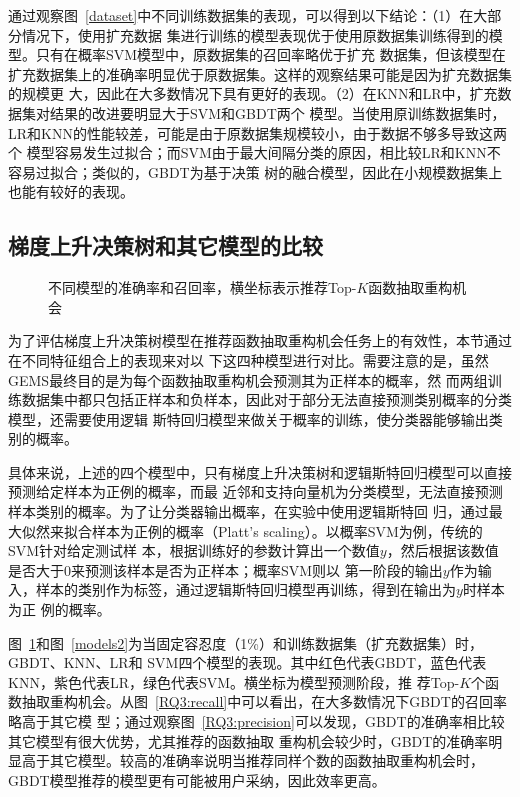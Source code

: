 通过观察图~\ref{dataset}中不同训练数据集的表现，可以得到以下结论：（1）在大部分情况下，使用扩充数据
集进行训练的模型表现优于使用原数据集训练得到的模型。只有在概率SVM模型中，原数据集的召回率略优于扩充
数据集，但该模型在扩充数据集上的准确率明显优于原数据集。这样的观察结果可能是因为扩充数据集的规模更
大，因此在大多数情况下具有更好的表现。（2）在KNN和LR中，扩充数据集对结果的改进要明显大于SVM和GBDT两个
模型。当使用原训练数据集时，LR和KNN的性能较差，可能是由于原数据集规模较小，由于数据不够多导致这两个
模型容易发生过拟合；而SVM由于最大间隔分类的原因，相比较LR和KNN不容易过拟合；类似的，GBDT为基于决策
树的融合模型，因此在小规模数据集上也能有较好的表现。

\subsection{梯度上升决策树和其它模型的比较}\label{RQ3}

\begin{figure}
\centering
{}
\hfill
{}
\caption{不同模型的准确率和召回率，横坐标表示推荐Top-$K$函数抽取重构机会}
\label{models1}
\end{figure}

为了评估梯度上升决策树模型在推荐函数抽取重构机会任务上的有效性，本节通过在不同特征组合上的表现来对以
下这四种模型进行对比。需要注意的是，虽然GEMS最终目的是为每个函数抽取重构机会预测其为正样本的概率，然
而两组训练数据集中都只包括正样本和负样本，因此对于部分无法直接预测类别概率的分类模型，还需要使用逻辑
斯特回归模型来做关于概率的训练，使分类器能够输出类别的概率。

具体来说，上述的四个模型中，只有梯度上升决策树和逻辑斯特回归模型可以直接预测给定样本为正例的概率，而最
近邻和支持向量机为分类模型，无法直接预测样本类别的概率。为了让分类器输出概率，在实验中使用逻辑斯特回
归，通过最大似然来拟合样本为正例的概率（Platt's scaling）。以概率SVM为例，传统的SVM针对给定测试样
本，根据训练好的参数计算出一个数值$y$，然后根据该数值是否大于0来预测该样本是否为正样本；概率SVM则以
第一阶段的输出$y$作为输入，样本的类别作为标签，通过逻辑斯特回归模型再训练，得到在输出为$y$时样本为正
例的概率。

图~\ref{models1}和图~\ref{models2}为当固定容忍度（1\%）和训练数据集（扩充数据集）时，GBDT、KNN、LR和
SVM四个模型的表现。其中红色代表GBDT，蓝色代表KNN，紫色代表LR，绿色代表SVM。横坐标为模型预测阶段，推
荐Top-$K$个函数抽取重构机会。从图~\ref{RQ3:recall}中可以看出，在大多数情况下GBDT的召回率略高于其它模
型；通过观察图~\ref{RQ3:precision}可以发现，GBDT的准确率相比较其它模型有很大优势，尤其推荐的函数抽取
重构机会较少时，GBDT的准确率明显高于其它模型。较高的准确率说明当推荐同样个数的函数抽取重构机会时，
GBDT模型推荐的模型更有可能被用户采纳，因此效率更高。

